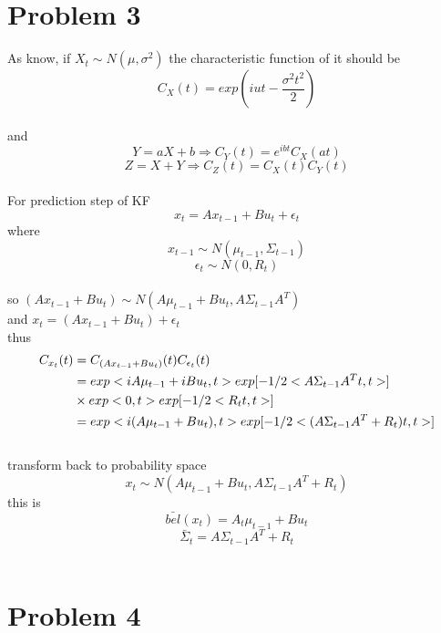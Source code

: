 \documentclass{article}
\begin{document}
\section{Problem 3}
As know, if $X_t\sim{N(\mu, \sigma^2)}$ the characteristic function of it should be \\
$$
C_X(t) = exp(iut - \dfrac{\sigma^2t^2}{2})
$$
\\and\\
$$
Y = aX + b \Rightarrow C_Y(t)=e^{ibt}C_X(at) 
$$
$$
Z = X + Y \Rightarrow C_Z(t) = C_X(t)C_Y(t)
$$\\
For prediction step of KF
$$
x_t = Ax_{t-1}+Bu_t + \epsilon_t
$$ where \\
$$x_{t-1}\sim{N(\mu_{t-1}, \Sigma_{t-1})}$$
$$\epsilon_t\sim{N(0, R_t)}$$\\
so $(Ax_{t-1}+Bu_t)\sim{N(A\mu_{t-1}+Bu_t, A\Sigma_{t-1}A^T)}$ \\and 
$x_t = (Ax_{t-1}+Bu_t) + \epsilon_t$\\
thus \\
$$
\begin{aligned}
C_{x_t}(t) &= C_{(Ax_{t-1}+Bu_t)}(t)C_{\epsilon_t}(t) \\
&=exp<iA\mu_{t-1}+iBu_t, t>exp[-1/2<A\Sigma_{t-1}A^Tt,t>]\\
&\times exp<0,t>exp[-1/2<R_tt, t>]\\
&=exp<i(A\mu_{t-1}+Bu_t), t>exp[-1/2<(A\Sigma_{t-1}A^T+R_t)t, t>]
\end{aligned}\\
$$ \\transform back to probability space \\
$$
x_t\sim{N(A\mu_{t-1}+Bu_t, A\Sigma_{t-1}A^T+R_t)}
$$ this is \\
$$
\bar{bel}(x_t) = A_t\mu_{t-1}+Bu_t
$$
$$
\bar{\Sigma}_t = A\Sigma_{t-1}A^T+R_t
$$\\


\section{Problem 4}
\end{document}
